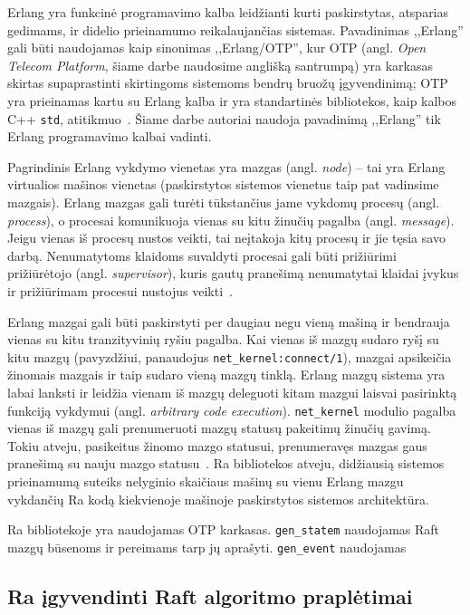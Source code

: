 \documentclass{VUMIFPSkursinis}
\newcommand{\TD}[1]{\todo[inline, color=red!40]{#1}}
\begin{document}
Erlang yra funkcinė programavimo kalba leidžianti kurti paskirstytas, atsparias gedimams, ir didelio prieinamumo reikalaujančias sistemas. Pavadinimas ,,Erlang'' gali būti naudojamas kaip sinonimas ,,Erlang/OTP'', kur OTP (angl. \textit{Open Telecom Platform}, šiame darbe naudosime anglišką santrumpą) yra karkasas skirtas supaprastinti skirtingoms sistemoms bendrų bruožų įgyvendinimą; OTP yra prieinamas kartu su Erlang kalba ir yra standartinės bibliotekos, kaip kalbos C++ \texttt{std}, atitikmuo~\cite{erlang_introduction}. Šiame darbe autoriai naudoja pavadinimą ,,Erlang'' tik Erlang programavimo kalbai vadinti.

Pagrindinis Erlang vykdymo vienetas yra mazgas (angl. \textit{node}) -- tai yra Erlang virtualios mašinos vienetas (paskirstytos sistemos vienetus taip pat vadinsime mazgais). Erlang mazgas gali turėti tūkstančius jame vykdomų procesų (angl. \textit{process}), o procesai komunikuoja vienas su kitu žinučių pagalba (angl. \textit{message}). Jeigu vienas iš procesų nustos veikti, tai neįtakoja kitų procesų ir jie tęsia savo darbą. Nenumatytoms klaidoms suvaldyti procesai gali būti prižiūrimi prižiūrėtojo (angl. \textit{supervisor}), kuris gautų pranešimą nenumatytai klaidai įvykus ir prižiūrimam procesui nustojus veikti~\cite{erlang_distributed}.

Erlang mazgai gali būti paskirstyti per daugiau negu vieną mašiną ir bendrauja vienas su kitu tranzityvinių ryšiu pagalba. Kai vienas iš mazgų sudaro ryšį su kitu mazgų (pavyzdžiui, panaudojus \texttt{net\_kernel:connect/1}), mazgai apsikeičia žinomais mazgais ir taip sudaro vieną mazgų tinklą. Erlang mazgų sistema yra labai lanksti ir leidžia vienam iš mazgų deleguoti kitam mazgui laisvai pasirinktą funkciją vykdymui (angl. \textit{arbitrary code execution}). \texttt{net\_kernel} modulio pagalba vienas iš mazgų gali prenumeruoti mazgų statusų pakeitimų žinučių gavimą. Tokiu atveju, pasikeitus žinomo mazgo statusui, prenumeravęs mazgas gaus pranešimą su nauju mazgo statusu~\cite{erlang_distributed, hebert_learn_2013}. Ra bibliotekos atveju, didžiausią sistemos prieinamumą suteiks nelyginio skaičiaus mašinų su vienu Erlang mazgu vykdančių Ra kodą kiekvienoje mašinoje paskirstytos sistemos architektūra.

\TD{where was I going with this}
Ra bibliotekoje yra naudojamas OTP karkasas. \texttt{gen\_statem} naudojamas Raft mazgų būsenoms ir pereimams tarp jų aprašyti. \texttt{gen\_event} naudojamas 

\subsection{Ra įgyvendinti Raft algoritmo praplėtimai}
\end{document}
